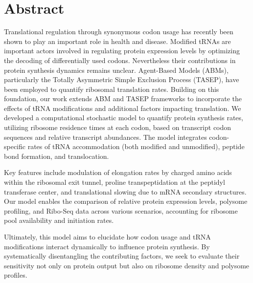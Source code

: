 \chapter{Abstract}                                 \label{ch:abstract}
Translational regulation through synonymous codon usage has recently been shown to play an important role in health and disease. Modified tRNAs are important actors involved in regulating protein expression levels by optimizing the decoding of differentially used codons. Nevertheless their contributions in protein synthesis dynamics remains unclear. Agent-Based Models (ABMs), particularly the Totally Asymmetric Simple Exclusion Process (TASEP), have been employed to quantify ribosomal translation rates. Building on this foundation, our work extends ABM and TASEP frameworks to incorporate the effects of tRNA modifications and additional factors impacting translation. We developed a computational stochastic model to quantify protein synthesis rates, utilizing ribosome residence times at each codon, based on transcript codon sequences and relative transcript abundances. The model integrates codon-specific rates of tRNA accommodation (both modified and unmodified), peptide bond formation, and translocation.

Key features include modulation of elongation rates by charged amino acids within the ribosomal exit tunnel, proline transpeptidation at the peptidyl transferase center, and translational slowing due to mRNA secondary structures. Our model enables the comparison of relative protein expression levels, polysome profiling, and Ribo-Seq data across various scenarios, accounting for ribosome pool availability and initiation rates.

Ultimately, this model aims to elucidate how codon usage and tRNA modifications interact dynamically to influence protein synthesis. By systematically disentangling the contributing factors, we seek to evaluate their sensitivity not only on protein output but also on ribosome density and polysome profiles. %


\instructionsabstract


\cleardoublepage

